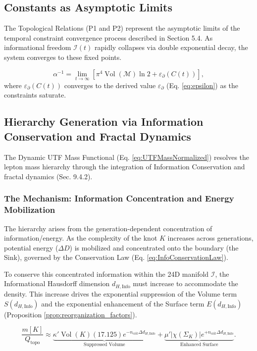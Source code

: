 \documentclass[11pt, a4paper]{article}
\theoremstyle{definition}
\theoremstyle{definition}
\newcommand{\M}{\mathcal{M}}
\newcommand{\Qtopo}{Q_{\text{topo}}}
\newcommand{\Ical}{\mathcal{I}}
\newcommand{\Vol}{\operatorname{Vol}}
\newcommand{\V}[1]{\Vol(#1)}
\newcommand{\Veight}{\Vol(\M)}
\newcommand{\dHInfo}{d_{H,\mathrm{Info}}} %
\newcommand{\ncrit}{n_{\mathrm{crit}}}
\newcommand{\Azero}{\pi^4 \Veight \ln 2}
\begin{document}
\subsection{Constants as Asymptotic Limits}

The Topological Relations (P1 and P2) represent the asymptotic limits of the temporal constraint convergence process described in Section 5.4. As informational freedom $\Ical(t)$ rapidly collapses via double exponential decay, the system converges to these fixed points.

\begin{equation}
\alpha^{-1} = \lim_{t \to \infty} \left[ \Azero + \varepsilon_{\partial}(C(t)) \right],
\end{equation}
where $\varepsilon_{\partial}(C(t))$ converges to the derived value $\varepsilon_{\partial}$ (Eq. \eqref{eq:epsilon}) as the constraints saturate.

\subsection{Hierarchy Generation via Information Conservation and Fractal Dynamics}
\label{sec:HierarchyGeneration}

The Dynamic UTF Mass Functional (Eq. \eqref{eq:UTFMassNormalized}) resolves the lepton mass hierarchy through the integration of Information Conservation and fractal dynamics (Sec. 9.4.2).

\subsubsection{The Mechanism: Information Concentration and Energy Mobilization}

The hierarchy arises from the generation-dependent concentration of information/energy. As the complexity of the knot $K$ increases across generations, potential energy ($\Delta D$) is mobilized and concentrated onto the boundary (the Sink), governed by the Conservation Law (Eq. \eqref{eq:InfoConservationLaw}).

To conserve this concentrated information within the 24D manifold $\Ical$, the Informational Hausdorff dimension $\dHInfo$ must increase to accommodate the density. This increase drives the exponential suppression of the Volume term $S(\dHInfo)$ and the exponential enhancement of the Surface term $E(\dHInfo)$ (Proposition \ref{prop:reorganization_factors}).

\begin{equation}
    \frac{m[K]}{\Qtopo} \approx \underbrace{\kappa' \V{K} (17.125) e^{-\ncrit \Delta \dHInfo}}_{\text{Suppressed Volume}} + \underbrace{\mu' |\chi(\Sigma_K)| e^{+\ncrit \Delta \dHInfo}}_{\text{Enhanced Surface}}.
\end{equation}
\end{document}
